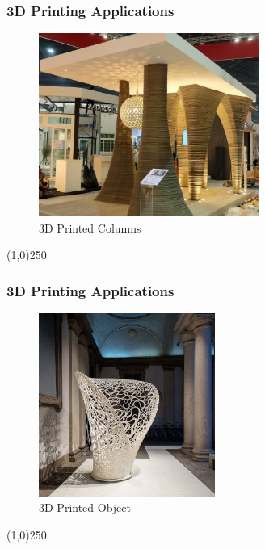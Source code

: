 \begin{frame}
\frametitle{3D Printing Applications}
\begin{figure}[h]
	\centering
	\includegraphics[height=6cm]{img/3DPrinting/3dprintColumn.jpg}
	\caption[3D Printed Columns]{3D Printed Columns}
	\label{fig:3dprintcolumn}
\end{figure}
\end{frame}
\begin{center}\line(1,0){250}\end{center}




\begin{frame}
\frametitle{3D Printing Applications}
\begin{figure}[h]
	\centering
	\includegraphics[height=6cm]{img/3DPrinting/3dprintedObject.jpg}
	\caption[3D Printed Object]{3D Printed Object}
	\label{fig:3dprintObject}
\end{figure}
\end{frame}
\begin{center}\line(1,0){250}\end{center}

